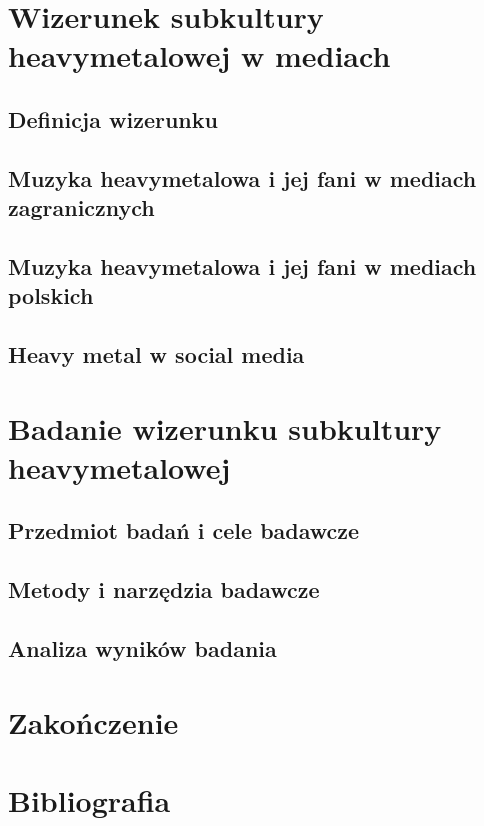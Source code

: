 \documentclass[12pt, a4paper, titlepage]{report}
\begin{document}
\chapter{Wizerunek subkultury heavymetalowej w mediach}
\section{Definicja wizerunku}
\section{Muzyka heavymetalowa i jej fani w mediach zagranicznych}
\section{Muzyka heavymetalowa i jej fani w mediach polskich}
\section{Heavy metal w social media}
\chapter{Badanie wizerunku subkultury heavymetalowej}
\section{Przedmiot badań i cele badawcze}
\section{Metody i narzędzia badawcze}
\section{Analiza wyników badania}
\chapter*{Zakończenie}
\chapter*{Bibliografia}
\end{document}
